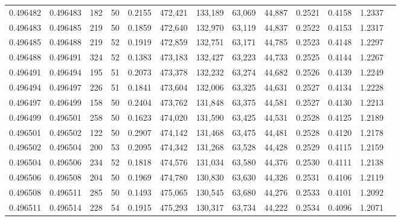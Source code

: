 \begin{tabular}{rrrrrrrrrrrrr}
0.496482 & 0.496483 &   182 &  50 &                                     0.2155 & 472,421 & 133,189 &  63,069 &  44,887 & 0.2521 & 0.4158 & 1.2337 \\
0.496483 & 0.496485 &   219 &  50 &                                     0.1859 & 472,640 & 132,970 &  63,119 &  44,837 & 0.2522 & 0.4153 & 1.2317 \\
0.496485 & 0.496488 &   219 &  52 &                                     0.1919 & 472,859 & 132,751 &  63,171 &  44,785 & 0.2523 & 0.4148 & 1.2297 \\
0.496488 & 0.496491 &   324 &  52 &                                     0.1383 & 473,183 & 132,427 &  63,223 &  44,733 & 0.2525 & 0.4144 & 1.2267 \\
0.496491 & 0.496494 &   195 &  51 &                                     0.2073 & 473,378 & 132,232 &  63,274 &  44,682 & 0.2526 & 0.4139 & 1.2249 \\
0.496494 & 0.496497 &   226 &  51 &                                     0.1841 & 473,604 & 132,006 &  63,325 &  44,631 & 0.2527 & 0.4134 & 1.2228 \\
0.496497 & 0.496499 &   158 &  50 &                                     0.2404 & 473,762 & 131,848 &  63,375 &  44,581 & 0.2527 & 0.4130 & 1.2213 \\
0.496499 & 0.496501 &   258 &  50 &                                     0.1623 & 474,020 & 131,590 &  63,425 &  44,531 & 0.2528 & 0.4125 & 1.2189 \\
0.496501 & 0.496502 &   122 &  50 &                                     0.2907 & 474,142 & 131,468 &  63,475 &  44,481 & 0.2528 & 0.4120 & 1.2178 \\
0.496502 & 0.496504 &   200 &  53 &                                     0.2095 & 474,342 & 131,268 &  63,528 &  44,428 & 0.2529 & 0.4115 & 1.2159 \\
0.496504 & 0.496506 &   234 &  52 &                                     0.1818 & 474,576 & 131,034 &  63,580 &  44,376 & 0.2530 & 0.4111 & 1.2138 \\
0.496506 & 0.496508 &   204 &  50 &                                     0.1969 & 474,780 & 130,830 &  63,630 &  44,326 & 0.2531 & 0.4106 & 1.2119 \\
0.496508 & 0.496511 &   285 &  50 &                                     0.1493 & 475,065 & 130,545 &  63,680 &  44,276 & 0.2533 & 0.4101 & 1.2092 \\
0.496511 & 0.496514 &   228 &  54 &                                     0.1915 & 475,293 & 130,317 &  63,734 &  44,222 & 0.2534 & 0.4096 & 1.2071 \\

\end{tabular}
